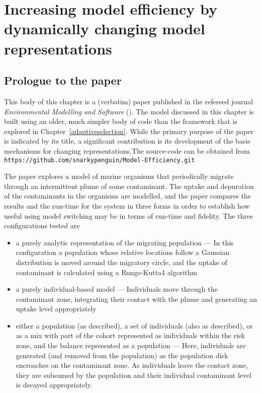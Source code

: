\chapter[INCREASING MODEL EFFICIENCY BY DYNAMICALLY CHANGING MODEL
  REPRESENTATIONS]{ Increasing model efficiency by dynamically
  changing model representations}\label{modelefficiency}

\WeAreOn{\ctwo}
\section{Prologue to the paper}
This body of this chapter is a (verbatim) paper published in the
refereed journal \emph{Environmental Modelling and Software\/}
(\cite{gray2012adaptive}).  The model discussed in this chapter is
built using an older, much simpler body of code than the framework
that is explored in Chapter~\ref{adaptiveselection}. While the primary
purpose of the paper is indicated by its title, a significant
contribution is its development of the basic mechanisms for
changing representations.The source-code can be
obtained from\linebreak
\texttt{https://github.com/snarkypenguin/Model-Efficiency.git}

The paper explores a model of marine organisms that periodically
migrate through an intermittent plume of some contaminant.  The uptake
and depuration of the contaminants in the organisms are modelled, and
the paper compares the results and the run-time for the system in three
forms in order to establish how useful using model switching may be in
terms of run-time and fidelity.  The three configurations tested are
\begin{itemize}
\item a purely analytic representation of the
  migrating population --- In this configuration a population whose
  relative locations follow a Gaussian distribution is moved around the
  migratory circle, and the uptake of contaminant is calculated using
  a Runge-Kutta4 algorithm
\item a purely individual-based model --- Individuals move through the
  contaminant zone, integrating their contact with the plume and
  generating an uptake level appropriately
\item either a population (as described), a set of individuals (also
  as described), or as a mix with part of the cohort represented as
  individuals within the risk zone, and the balance represented as a
  population --- Here, individuals are generated (and removed from the
  population) as the population disk encroaches on the contaminant
  zone. As individuals leave the contact zone, they are subsumed by
  the population and their individual contaminant level is decayed
  appropriately.
\end{itemize}

